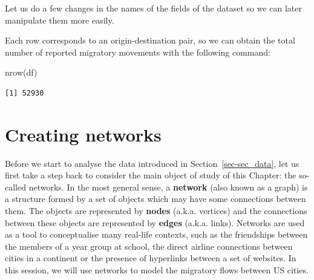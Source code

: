 \documentclass[
  letterpaper,
  DIV=11,
  numbers=noendperiod]{scrreprt}
\newenvironment{Shaded}{\begin{snugshade}}{\end{snugshade}}
\newcommand{\CommentTok}[1]{\textcolor[rgb]{0.37,0.37,0.37}{#1}}
\newcommand{\FunctionTok}[1]{\textcolor[rgb]{0.28,0.35,0.67}{#1}}
\newcommand{\NormalTok}[1]{\textcolor[rgb]{0.00,0.23,0.31}{#1}}
\newcommand{\OtherTok}[1]{\textcolor[rgb]{0.00,0.23,0.31}{#1}}
\newcommand{\SpecialCharTok}[1]{\textcolor[rgb]{0.37,0.37,0.37}{#1}}
\newcommand{\StringTok}[1]{\textcolor[rgb]{0.13,0.47,0.30}{#1}}
\begin{document}
Let us do a few changes in the names of the fields of the dataset so we
can later manipulate them more easily.

\begin{Shaded}
\end{Shaded}

Each row corresponds to an origin-destination pair, so we can obtain the
total number of reported migratory movements with the following command:

\begin{Shaded}
\begin{Highlighting}[]
\FunctionTok{nrow}\NormalTok{(df)}
\end{Highlighting}
\end{Shaded}

\begin{verbatim}
[1] 52930
\end{verbatim}

\hypertarget{sec-sec_create}{%
\section{Creating networks}\label{sec-sec_create}}

Before we start to analyse the data introduced in
Section~\ref{sec-sec_data}, let us first take a step back to consider
the main object of study of this Chapter: the so-called networks. In the
most general sense, a \textbf{network} (also known as a graph) is a
structure formed by a set of objects which may have some connections
between them. The objects are represented by \textbf{nodes} (a.k.a.
vertices) and the connections between these objects are represented by
\textbf{edges} (a.k.a. links). Networks are used as a tool to
conceptualise many real-life contexts, such as the friendships between
the members of a year group at school, the direct airline connections
between cities in a continent or the presence of hyperlinks between a
set of websites. In this session, we will use networks to model the
migratory flows between US cities.
\end{document}
